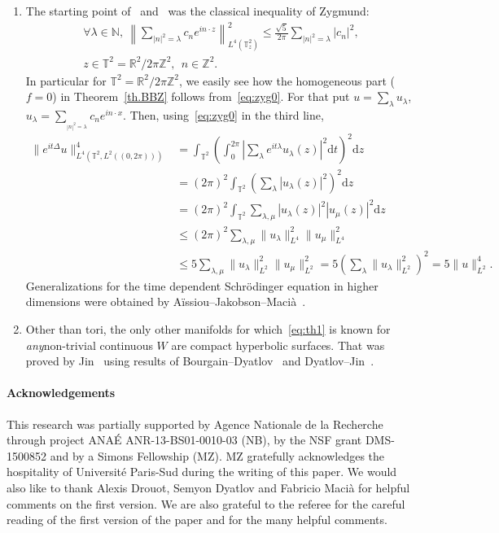 \documentclass[10pt]{amsart}
\theoremstyle{definition}\newtheorem{defi}[theo]{Definition}\newtheorem{rema}[theo]{Remark}\newtheorem{exam}[theo]{Example}\newtheorem{exem}[theo]{Example}\newtheorem{nota}[theo]{Notation}
\newcommand{\R}{{\mathbb R}}
\newcommand{\TT}{{\mathbb T}}
\newcommand{\ZZ}{{\mathbb Z}}
\newcommand*\N{\mathbb N}
\newcommand*{\dd}{\mathrm{d}}
\newcommand*{\dz}{\dd z}
\newcommand*{\dt}{\dd t}
\let\oldforall\forall
\renewcommand*{\forall}{\mathrel{\oldforall}}
\newenvironment{remasc*}{\let\pointir\relax \begin{remas*}}{\end{remas*}}
\newtheorem*{remas*}{Remarks}
\begin{document}
\begin{remasc*}
\begin{enumerate}
\item \label{rem3} The starting point of~\cite{Jak} and~\cite{BBZ} was the classical inequality of Zygmund:
\begin{multline}\label{eq:zyg0}
\forall \lambda \in \N,\ \left\| \sum_{{ |n|^2= \lambda}} c_ne^{in \cdot z} \right\|_{L^4(\TT^2_z)}^2 \leq \frac{\sqrt 5}{ 2 \pi}
\sum_{{ |n|^2= \lambda}} |c_n|^2, \\ z \in \TT^2 = \R^2 / 2 \pi \ZZ^2, \ \ n \in \ZZ^2.
\end{multline}
In particular for $ \TT^2 = \R^2/ 2 \pi \ZZ^2 $, we easily see how the homogeneous part ($f=0$) in Theorem~\ref{th.BBZ} follows from~\eqref{eq:zyg0}. For that put $ u = \sum_{\lambda } u_\lambda$, $ u_\lambda = \sum_{ _{ { |n|^2= \lambda}} } c_n e^{ i n \cdot x} $. Then, using~\eqref{eq:zyg0} in the third line,
\begin{align*}
\| e^{ it \Delta } u \|_{ L^4 (\TT^2, L^2 ((0, 2 \pi))) }^4 & =
\int_{ \TT^2 } \left(\int_{0}^{2\pi } \left| \sum_{ \lambda } e^{ it \lambda} u_\lambda (z) \right|^2 \dt \right)^2 \dz \\
& = (2 \pi)^2 \int_{ \TT^2 } \left(\sum_\lambda | u_\lambda (z) |^2 \right)^2 \dz \\
& = (2 \pi)^2\int_{\TT^2 } \sum_{ \lambda, \mu} |u_\lambda (z) |^2 |u_\mu (z) |^2 \dz \\
&\leq (2 \pi)^2\sum_{ \lambda, \mu } \| u_\lambda \|_{L^4}^2 \| u_\mu \|_{L^4}^2\\
& \leq 5 \sum_{ \lambda, \mu} \| u_\lambda \|_{L^2}^2 \| u_\mu \|_{L^2}^2 = 5 \left(\sum_\lambda \| u_\lambda \|_{L^2}^2 \right)^2 = 5 \| u \|_{L^2}^4.
\end{align*}
Generalizations for the time dependent Schrödinger equation in higher dimensions were obtained by Aïssiou--Jakobson--Macià~\cite{AJM}.

\item \label{rem4} Other than tori, the only other manifolds for which~\eqref{eq:th1} is known for \emph{any}\linebreak non-trivial continuous $ W $ are compact hyperbolic surfaces. That was proved by Jin~\cite{Ji} using results of Bourgain--Dyatlov~\cite{BD} and Dyatlov--Jin~\cite{DJ}.
\end{enumerate}
\end{remasc*}

\paragraph*{Acknowledgements}
This research was partially supported by Agence Nationale de la Recherche through project ANAÉ ANR-13-BS01-0010-03 (NB), by the NSF grant DMS-1500852 and by a Simons Fellowship (MZ). MZ gratefully acknowledges the hospitality of Université Paris-Sud during the writing of this paper. We would also like to thank Alexis Drouot, Semyon Dyatlov and Fabricio Macià for helpful comments on the first version. We are also grateful to the referee for the careful reading of the first version of the paper and for the many helpful comments.
\end{document}
